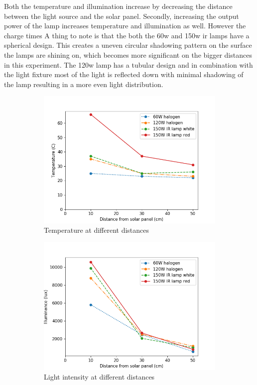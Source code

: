 Both the temperature and illumination increase by decreasing the distance between the light source and the solar panel. 
Secondly, increasing the output power of the lamp increases temperature and illumination as well. 
However the charge times 
A thing to note is that the both the 60w and 150w ir lamps have a spherical design. This creates a uneven circular shadowing pattern on the surface the lamps are shining on, which becomes more significant on the bigger distances in this experiment.
The 120w lamp has a tubular design and in combination with the light fixture most of the light is reflected down with minimal shadowing of the lamp resulting in a more even light distribution.

\begin{figure}
	\centering
	\begin{subfigure}[b]{0.49\textwidth}
		\includegraphics[width=\textwidth]{pics/light_experiment_temp.png}
		\caption{Temperature at different distances}
		\label{fig:light_temp}
	\end{subfigure}
	\begin{subfigure}[b]{0.49\textwidth}
		\includegraphics[width=\textwidth]{pics/light_experiment_lux.png}
		\caption{Light intensity at different distances}
		\label{fig:light_lux}
	\end{subfigure}
	\caption{}
\end{figure}


